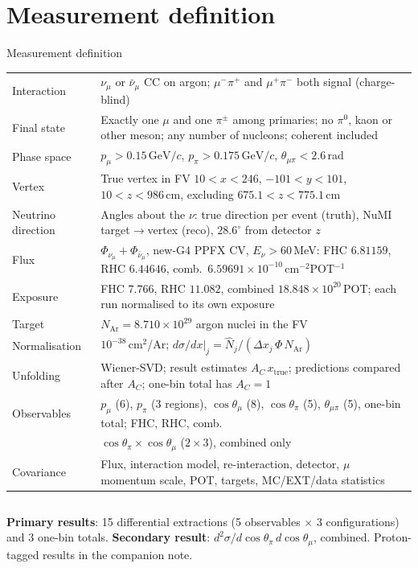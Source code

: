 \documentclass[aspectratio=169,10pt]{beamer}
\newcommand{\GeVc}{\,\text{GeV}/c}
\begin{document}
\section{Measurement definition}
\begin{frame}{Measurement definition}
  \centering\scriptsize\setlength{\tabcolsep}{4pt}
  \begin{tabular}{@{}p{2.6cm}p{11.6cm}@{}}
    \toprule
    Interaction & $\nu_\mu$ or $\bar\nu_\mu$ CC on argon; $\mu^-\pi^+$ and $\mu^+\pi^-$ both signal (charge-blind) \\
    Final state & Exactly one $\mu$ and one $\pi^\pm$ among primaries; no $\pi^0$, kaon or other meson; any number of nucleons; coherent included \\
    Phase space & $p_\mu>0.15\GeVc$, $p_\pi>0.175\GeVc$, $\theta_{\mu\pi}<2.6$\,rad \\
    Vertex & True vertex in FV $10<x<246$, $-101<y<101$, $10<z<986$\,cm, excluding $675.1<z<775.1$\,cm \\
    Neutrino direction & Angles about the $\nu$: true direction per event (truth), NuMI target$\to$vertex (reco), $28.6^\circ$ from detector $z$ \\
    Flux & $\Phi_{\nu_\mu}+\Phi_{\bar\nu_\mu}$, new-G4 PPFX CV, $E_\nu>60$\,MeV: FHC $6.81159$, RHC $6.44646$, comb.\ $6.59691\times10^{-10}$\,cm$^{-2}$POT$^{-1}$ \\
    Exposure & FHC $7.766$, RHC $11.082$, combined $18.848\times10^{20}$\,POT; each run normalised to its own exposure \\
    Target & $N_\mathrm{Ar}=8.710\times10^{29}$ argon nuclei in the FV \\
    Normalisation & $10^{-38}$\,cm$^2$/Ar;\; $d\sigma/dx|_j=\hat N_j/(\Delta x_j\,\Phi\,N_\mathrm{Ar})$ \\
    Unfolding & Wiener-SVD; result estimates $A_C\,x_\mathrm{true}$; predictions compared after $A_C$; one-bin total has $A_C=1$ \\
    Observables & $p_\mu$ (6), $p_\pi$ (3 regions), $\cos\theta_\mu$ (8), $\cos\theta_\pi$ (5), $\theta_{\mu\pi}$ (5), one-bin total; FHC, RHC, comb.\\
     & $\cos\theta_\pi\times\cos\theta_\mu$ ($2\times3$), combined only \\
    Covariance & Flux, interaction model, re-interaction, detector, $\mu$ momentum scale, POT, targets, MC/EXT/data statistics \\
    \bottomrule
  \end{tabular}
  \vspace{2mm}
  \begin{columns}[T]
  \scriptsize
  \textbf{Primary results}: 15 differential extractions (5 observables $\times$ 3 configurations) and 3 one-bin totals.
  \scriptsize
  \textbf{Secondary result}: $d^2\sigma/d\cos\theta_\pi\,d\cos\theta_\mu$, combined. Proton-tagged results in the companion note.
  \end{columns}
\end{frame}
\end{document}
